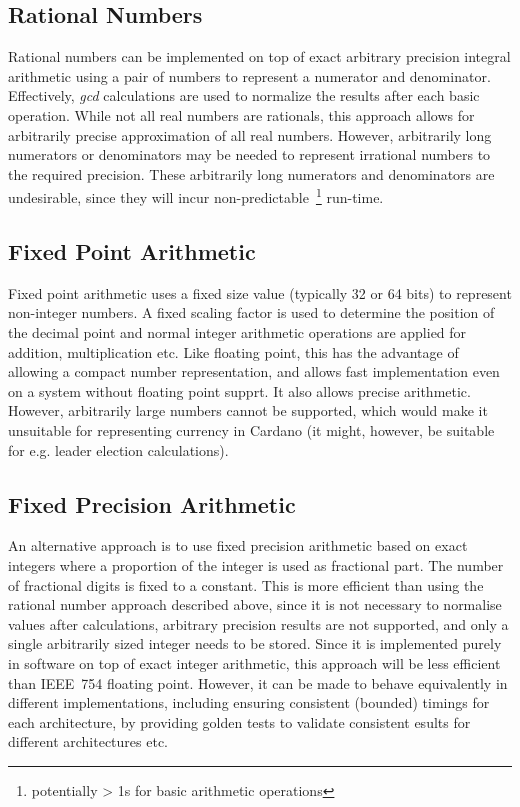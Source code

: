 \documentclass[11pt,a4paper,dvipsnames,twosided]{article}
\theoremstyle{definition}
\theoremstyle{definition}
\begin{document}
\subsection{Rational Numbers}
\label{sec:rational-numbers}

Rational numbers can be implemented on top of exact arbitrary precision integral
arithmetic using a pair of numbers to represent a numerator and denominator.
Effectively, \emph{gcd} calculations are used to normalize the results
after each basic operation. While not all real numbers are rationals, this approach allows for
arbitrarily precise approximation of all real numbers. However, arbitrarily
long numerators or denominators may be needed to represent irrational numbers to the required precision.
These arbitrarily long numerators and denominators are undesirable, since they will incur non-predictable~\footnote{potentially > 1s for basic arithmetic operations}
run-time.

\subsection{Fixed Point Arithmetic}

Fixed point arithmetic uses a fixed size value (typically 32 or 64 bits) to
represent non-integer numbers.  A fixed scaling factor is used to determine the
position of the decimal point and normal integer arithmetic operations are
applied for addition, multiplication etc.  Like floating point, this has the
advantage of allowing a compact number representation, and allows fast implementation even on
a system without floating point supprt.  It also allows precise arithmetic.  However,
arbitrarily large numbers cannot be supported, which would make it unsuitable for
representing currency in Cardano (it might, however, be suitable for e.g. leader election calculations).


\subsection{Fixed Precision Arithmetic}
\label{sec:fixed-point-arithm}

An alternative approach is to use fixed precision arithmetic based on exact
integers where a proportion of the integer is used as fractional part.  The
number of fractional digits is fixed to a constant.  This is more efficient than
using the rational number approach described above, since it is not necessary to
normalise values after calculations, arbitrary precision results are not
supported, and only a single arbitrarily sized integer needs to be stored.
Since it is implemented purely in software on top of exact integer arithmetic,
this approach will be less efficient than IEEE~754 floating point.  However, it
can be made to behave equivalently in different implementations, including
ensuring consistent (bounded) timings for each architecture, by providing golden
tests to validate consistent esults for different architectures etc.
\end{document}
